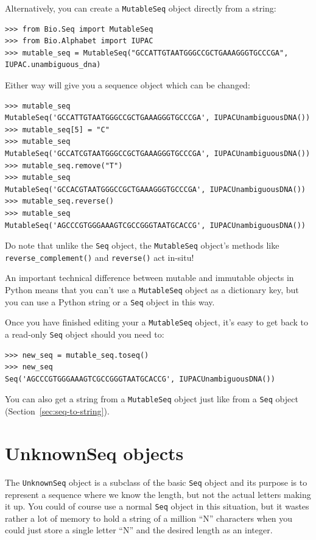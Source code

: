 \documentclass{report}
\begin{document}
Alternatively, you can create a \verb|MutableSeq| object directly from a string:
\begin{verbatim}
>>> from Bio.Seq import MutableSeq
>>> from Bio.Alphabet import IUPAC
>>> mutable_seq = MutableSeq("GCCATTGTAATGGGCCGCTGAAAGGGTGCCCGA", IUPAC.unambiguous_dna)
\end{verbatim}

Either way will give you a sequence object which can be changed:
\begin{verbatim}
>>> mutable_seq
MutableSeq('GCCATTGTAATGGGCCGCTGAAAGGGTGCCCGA', IUPACUnambiguousDNA())
>>> mutable_seq[5] = "C"
>>> mutable_seq
MutableSeq('GCCATCGTAATGGGCCGCTGAAAGGGTGCCCGA', IUPACUnambiguousDNA())
>>> mutable_seq.remove("T")
>>> mutable_seq
MutableSeq('GCCACGTAATGGGCCGCTGAAAGGGTGCCCGA', IUPACUnambiguousDNA())
>>> mutable_seq.reverse()
>>> mutable_seq
MutableSeq('AGCCCGTGGGAAAGTCGCCGGGTAATGCACCG', IUPACUnambiguousDNA())
\end{verbatim}

Do note that unlike the \verb|Seq| object, the \verb|MutableSeq| object's methods like \verb|reverse_complement()| and \verb|reverse()| act in-situ!

An important technical difference between mutable and immutable objects in Python means that you can't use a \verb|MutableSeq| object as a dictionary key, but you can use a Python string or a \verb|Seq| object in this way.

Once you have finished editing your a \verb|MutableSeq| object, it's easy to get back to a read-only \verb|Seq| object should you need to:

\begin{verbatim}
>>> new_seq = mutable_seq.toseq()
>>> new_seq
Seq('AGCCCGTGGGAAAGTCGCCGGGTAATGCACCG', IUPACUnambiguousDNA())
\end{verbatim}

You can also get a string from a \verb|MutableSeq| object just like from a \verb|Seq| object (Section~\ref{sec:seq-to-string}).

\section{UnknownSeq objects}
The \verb|UnknownSeq| object is a subclass of the basic \verb|Seq| object
and its purpose is to represent a
sequence where we know the length, but not the actual letters making it up.
You could of course use a normal \verb|Seq| object in this situation, but it wastes
rather a lot of memory to hold a string of a million ``N'' characters when you could
just store a single letter ``N'' and the desired length as an integer.
\end{document}
